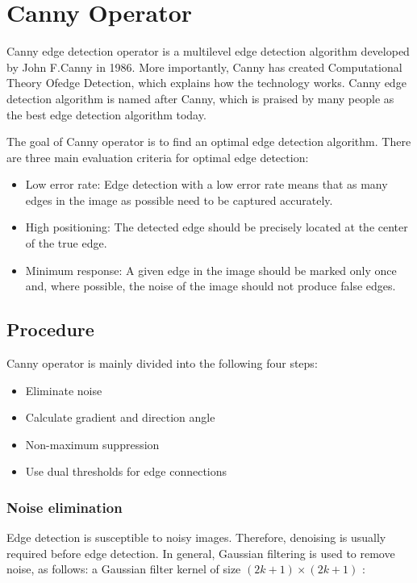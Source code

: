 \documentclass[review]{cvpr}
\begin{document}
\section{Canny Operator}
Canny edge detection operator is a multilevel edge detection algorithm developed by John F.Canny in 1986. More importantly, Canny has created Computational Theory Ofedge Detection, which explains how the technology works. Canny edge detection algorithm is named after Canny, which is praised by many people as the best edge detection algorithm today.

The goal of Canny operator is to find an optimal edge detection algorithm. There are three main evaluation criteria for optimal edge detection:
\begin{itemize}
  \item Low error rate: Edge detection with a low error rate means that as many edges in the image as possible need to be captured accurately.
  \item High positioning: The detected edge should be precisely located at the center of the true edge.
  \item Minimum response: A given edge in the image should be marked only once and, where possible, the noise of the image should not produce false edges.
\end{itemize}

\subsection{Procedure}
Canny operator is mainly divided into the following four steps:
\begin{itemize}
  \item Eliminate noise
  \item Calculate gradient and direction angle
  \item Non-maximum suppression
  \item Use dual thresholds for edge connections
\end{itemize}

\subsubsection{Noise elimination}

Edge detection is susceptible to noisy images. Therefore, denoising is usually required before edge detection. In general, Gaussian filtering is used to remove noise, as follows: a Gaussian filter kernel of size $(2k+1)\times(2k+1)$ :
\end{document}
